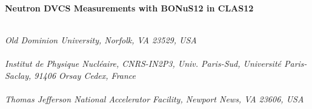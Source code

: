 \begin{titlepage}
     \begin{center}
       \vspace*{-1.8cm}
       \noindent \Huge \textbf{Neutron DVCS Measurements with BONuS12 in 
        CLAS12} \\
     \end{center}
   
\renewcommand{\thefootnote}{\fnsymbol{footnote}}
     \begin{center}


       \vspace*{1.0cm}
         \\
       \vspace*{0.2cm}
       \noindent \emph{Old Dominion University, Norfolk, VA 23529, USA} \\


       \vspace*{1.0cm}
        \\
       \vspace*{0.2cm}
       \noindent \emph{Institut de Physique Nucl\'eaire, CNRS-IN2P3, Univ. Paris-Sud, 
                       Universit\'e Paris-Saclay, 91406 Orsay Cedex, France} \\
       
        \vspace*{1.0cm}
        \\
       \vspace*{0.2cm}
       \noindent \emph{Thomas Jefferson National Accelerator Facility, Newport News, VA 23606, USA} \\
        
        
        
        
        
        \vspace*{0.7cm}
        \\
      \end{center}
\renewcommand*{\thefootnote}{\arabic{footnote}}

\date{\today}
     

\end{titlepage}
\sloppy

\titlepage
